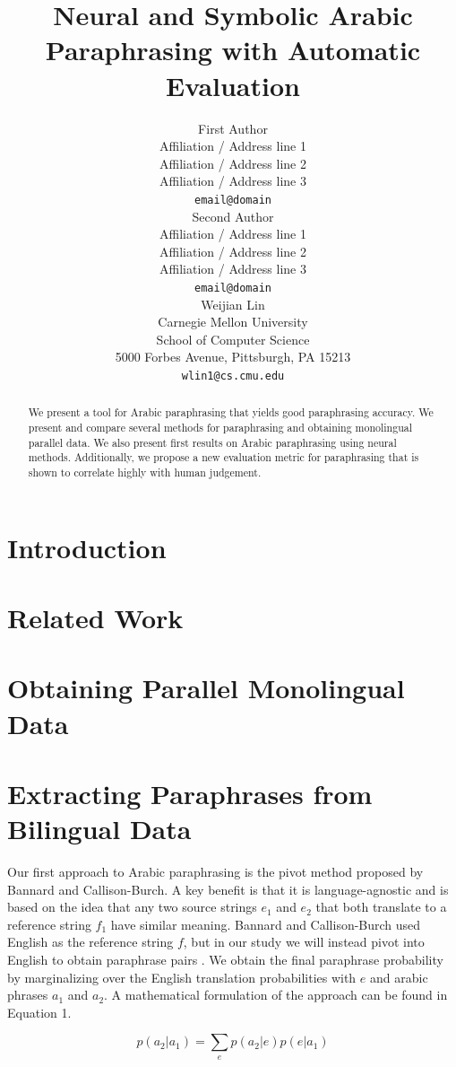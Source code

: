 \documentclass[11pt,letterpaper]{article}
\title{Neural and Symbolic Arabic Paraphrasing with Automatic Evaluation}
\author{First Author \\
  Affiliation / Address line 1 \\
  Affiliation / Address line 2 \\
  Affiliation / Address line 3 \\
  {\tt email@domain} \\\And
  Second Author \\
  Affiliation / Address line 1 \\
  Affiliation / Address line 2 \\
  Affiliation / Address line 3 \\
  {\tt email@domain} \\\And
  Weijian Lin \\
 Carnegie Mellon University\\
 School of Computer Science \\ 
 5000 Forbes Avenue, Pittsburgh, PA 15213 \\
  {\tt wlin1@cs.cmu.edu} \\}
\date{}
\begin{document}
\maketitle
\begin{abstract}

	We present a tool for Arabic paraphrasing that yields good paraphrasing accuracy.  We present and compare several methods for paraphrasing and obtaining monolingual parallel data. We also present first results on Arabic paraphrasing using neural methods. Additionally, we propose a new evaluation metric for paraphrasing that is shown to correlate highly with human judgement.
\end{abstract}


\section{Introduction}

\section{Related Work}

\section{Obtaining Parallel Monolingual Data}

\section{Extracting Paraphrases from Bilingual Data}
Our first approach to Arabic paraphrasing is the pivot method proposed by Bannard and Callison-Burch\cite{bannard2005bilingual}. A key benefit is that it is language-agnostic and is based on the idea that any two source strings $e_1$ and $e_2$ that both translate to a reference string $f_1$ have similar meaning. Bannard and Callison-Burch used English as the reference string $f$, but in our study we will instead pivot into English to obtain paraphrase pairs \cite{bannard2005bilingual}. We obtain the final paraphrase probability by marginalizing over the English translation probabilities with $e$ and arabic phrases $a_1$ and $a_2$. A mathematical formulation of the approach can be found in Equation 1.

\begin{equation}
p(a_2 | a_1) = \sum_{e} p(a_2 | e) p(e | a_1)
\end{equation}
\end{document}
